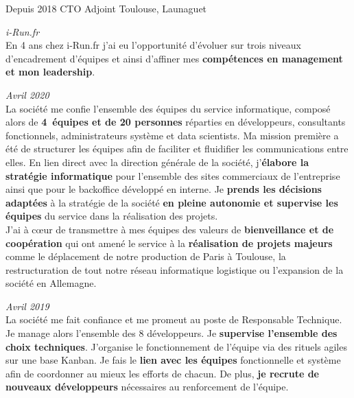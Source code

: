 \documentclass{friggeri-cv} 	%
\begin{document}
\begin{entrylist}
\entry
{Depuis 2018}
{CTO Adjoint}
{Toulouse, Launaguet}
{\vspace{-0.2cm}\emph{i-Run.fr} \\

En 4 ans chez i-Run.fr j’ai eu l’opportunité d’évoluer sur trois niveaux d’encadrement d’équipes et ainsi d’affiner mes \textbf{compétences en management et mon leadership}.
\begin{description}[leftmargin=0cm]
    \item [\hspace*{-1cm}\bodyfont{|} \normalfont \textbf{\color{orange}CTO \color{headercolor}Adjoint}] \hfill \textit{Avril 2020}\\
    La société me confie l’ensemble des équipes du service informatique, composé alors de \textbf{4~équipes et de 20 personnes} réparties en développeurs, consultants fonctionnels, administrateurs système et data scientists. Ma mission première a été de structurer les équipes afin de faciliter et fluidifier les communications entre elles. En lien direct avec la direction générale de la société, j’\textbf{élabore la stratégie informatique} pour l’ensemble des sites commerciaux de l’entreprise ainsi que pour le backoffice développé en interne. Je \textbf{prends les décisions adaptées} à la stratégie de la société \textbf{en pleine autonomie et supervise les équipes} du service dans la réalisation des projets.\\
    J’ai à c\oe{ur} de transmettre à mes équipes des valeurs de \textbf{bienveillance et de coopération} qui ont amené le service à la \textbf{réalisation de projets majeurs} comme le déplacement de notre production de Paris à Toulouse, la restructuration de tout notre réseau informatique logistique ou l’expansion de la société en Allemagne.
    \item [\hspace*{-1cm}\bodyfont{|} \normalfont \textbf{\color{orange}Responsable \color{headercolor}Technique}] \hfill \textit{Avril 2019}\\
    La société me fait confiance et me promeut au poste de Responsable Technique. Je manage alors l’ensemble des 8 développeurs. Je \textbf{supervise l’ensemble des choix techniques}. J’organise le fonctionnement de l’équipe via des rituels agiles sur une base Kanban. Je fais le \textbf{lien avec les équipes} fonctionnelle et système afin de coordonner au mieux les efforts de chacun. De plus, \textbf{je recrute de nouveaux développeurs} nécessaires au renforcement de l’équipe.

\end{description}}
\end{entrylist}
\end{document}
